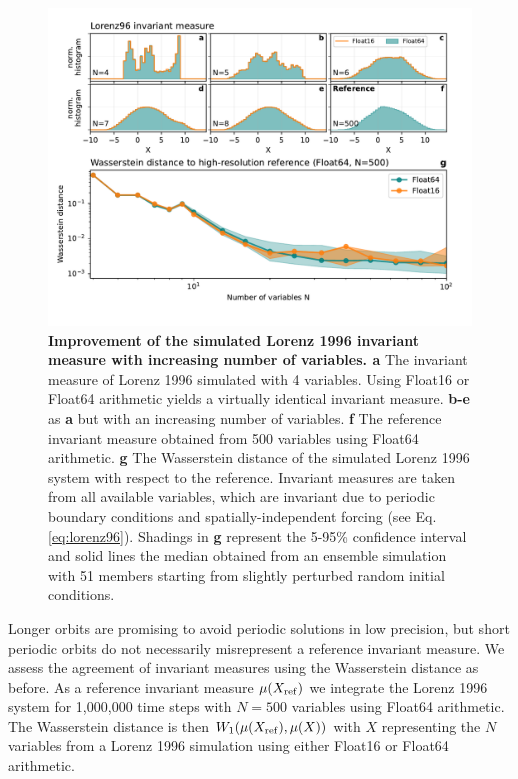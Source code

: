 \begin{figure}[tbhp]
	\includegraphics[width=1\textwidth]{Figures/orbits/L96_invmeasures.pdf}
	\caption{\textbf{Improvement of the simulated Lorenz 1996 invariant measure with increasing
	number of variables. a} The invariant measure of Lorenz 1996 simulated with 4 variables. Using
	Float16 or Float64 arithmetic yields a virtually identical invariant measure. \textbf{b-e} as \textbf{a} but with an
	increasing number of variables. \textbf{f} The reference invariant measure obtained from 500 variables
	using Float64 arithmetic. \textbf{g} The Wasserstein distance of the simulated Lorenz 1996 system with
	respect to the reference. Invariant measures are taken from all available variables, which are
	invariant due to periodic boundary conditions and spatially-independent forcing (see Eq. \ref{eq:lorenz96}).
	Shadings in \textbf{g} represent the 5-95\% confidence interval and solid lines the median obtained from
	an ensemble simulation with 51 members starting from slightly perturbed random initial conditions.}
	\label{fig:L96_invmeasures}
\end{figure}

Longer orbits are promising to avoid periodic solutions in low precision, but short periodic orbits do not necessarily misrepresent a
reference invariant measure. We assess the agreement of invariant measures using the Wasserstein distance as before. As a reference
invariant measure $\mu(X_{\operatorname{ref}})$ we integrate the Lorenz 1996 system for 1,000,000 time steps with $N=500$ variables using
Float64 arithmetic. The Wasserstein distance is then $W_1(\mu(X_{\operatorname{ref}}),\mu(X))$ with $X$ representing the $N$ variables from a
Lorenz 1996 simulation using either Float16 or Float64 arithmetic. 

